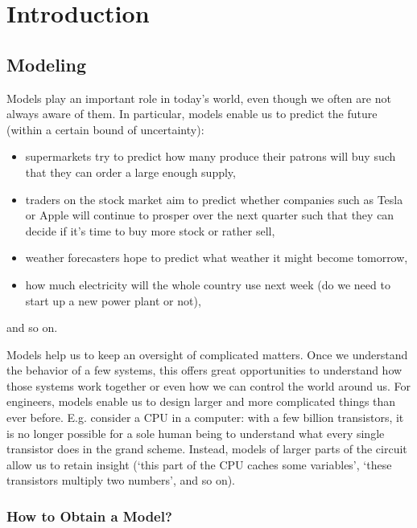 \chapter{Introduction}
\def\thisDir{ch01-intro}

\section{Modeling}
Models play an important role in today's world, even though we often are not always aware of them.
In particular, models enable us to predict the future (within a certain bound of uncertainty):
\begin{itemize}
  \item supermarkets try to predict how many produce their patrons will buy such that they can order a large enough supply,
  \item traders on the stock market aim to predict whether companies such as Tesla or Apple will continue to prosper over the next quarter such that they can decide if it's time to buy more stock or rather sell,
  \item weather forecasters hope to predict what weather it might become tomorrow,
  \item how much electricity will the whole country use next week (do we need to start up a new power plant or not),
\end{itemize}
and so on.

Models help us to keep an oversight of complicated matters.
Once we understand the behavior of a few systems, this offers great opportunities to understand how those systems work together or even how we can control the world around us.
For engineers, models enable us to design larger and more complicated things than ever before.
E.g. consider a \gls{CPU} in a computer: with a few billion transistors, it is no longer possible for a sole human being to understand what every single transistor does in the grand scheme.
Instead, models of larger parts of the circuit allow us to retain insight (`this part of the \gls{CPU} caches some variables', `these transistors multiply two numbers', and so on).

\subsection{How to Obtain a Model?}

